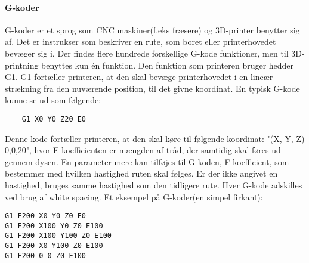 
\paragraph{G-koder} %
\newline
G-koder er et sprog som CNC maskiner(f.eks fræsere) og 3D-printer benytter sig af. Det er instrukser som beskriver en rute, som boret eller printerhovedet bevæger sig i. \cite{gkode} 
Der findes flere hundrede forskellige G-kode funktioner, men til 3D-printning benyttes kun én funktion. Den funktion som printeren bruger hedder G1. G1 fortæller printeren, at den skal bevæge printerhovedet i en lineær strækning fra den nuværende position, til det givne koordinat.
En typisk G-kode kunne se ud som følgende: 

\begin{verbatim}
	G1 X0 Y0 Z20 E0
\end{verbatim}


Denne kode fortæller printeren, at den skal køre til følgende koordinat: "(X, Y, Z) 0,0,20", hvor E-koefficienten er mængden af tråd, der samtidig skal føres ud gennem dysen.
En parameter mere kan tilføjes til G-koden, F-koefficient, som bestemmer med hvilken hastighed ruten skal følges. Er der ikke angivet en hastighed, bruges samme hastighed som den tidligere rute. 
Hver G-kode adskilles ved brug af white spacing.
Et eksempel på G-koder(en simpel firkant):
\begin{lstlisting}
G1 F200 X0 Y0 Z0 E0
G1 F200 X100 Y0 Z0 E100
G1 F200 X100 Y100 Z0 E100
G1 F200 X0 Y100 Z0 E100
G1 F200 0 0 Z0 E100
\end{lstlisting}